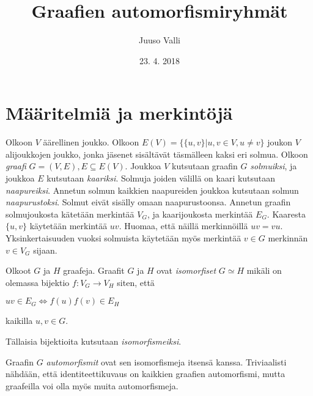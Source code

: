 \documentclass[a4paper, 12pt]{article}
\theoremstyle{definition}
\theoremstyle{plain}
\begin{document}
\title{Graafien automorfismiryhmät}
\author{Juuso Valli}
\date{23. 4. 2018}

\maketitle

\tableofcontents

\newpage

\section{Määritelmiä ja merkintöjä}

Olkoon $V$ äärellinen joukko. Olkoon $E(V) = \{\{u, v\} | u, v \in V, u \neq v\}$ joukon $V$ alijoukkojen joukko, jonka jäsenet sisältävät täsmälleen kaksi eri solmua.
Olkoon \emph{graafi} $G = (V, E), E \subseteq E(V)$. Joukkoa $V$ kutsutaan graafin $G$ \emph{solmuiksi}, ja joukkoa $E$ kutsutaan \emph{kaariksi}. Solmuja joiden välillä on kaari kutsutaan \emph{naapureiksi}. Annetun solmun kaikkien naapureiden joukkoa kutsutaan solmun \emph{naapurustoksi}. Solmut eivät sisälly omaan naapurustoonsa. Annetun graafin solmujoukosta kätetään merkintää $V_G$, ja kaarijoukosta merkintää $E_G$.
Kaaresta $\{u, v\}$ käytetään merkintää $uv$. Huomaa, että näillä merkinnöillä $uv = vu$.
Yksinkertaisuuden vuoksi solmuista käytetään myös merkintää $v \in G$ merkinnän $v \in V_G$ sijaan.

Olkoot $G$ ja $H$ graafeja. Graafit $G$ ja $H$ ovat \emph{isomorfiset} $G \simeq H$ mikäli on olemassa bijektio $f: V_G \rightarrow V_H$ siten, että
\begin{center}
\begin{math}
uv \in E_G \Longleftrightarrow f(u)f(v) \in E_H
\end{math}
\end{center}
kaikilla $u, v \in G$.

Tällaisia bijektioita kutsutaan \emph{isomorfismeiksi}.

Graafin $G$ \emph{automorfismit} ovat sen isomorfismeja itsensä kanssa. Triviaalisti nähdään, että identiteettikuvaus on kaikkien graafien automorfismi, mutta graafeilla voi olla myös muita automorfismeja.
\end{document}
